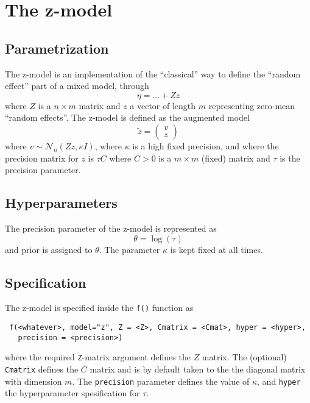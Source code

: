 \documentclass[a4paper,11pt]{article}
\begin{document}
\section*{The z-model}

\subsection*{Parametrization}

The z-model is an implementation of the ``classical'' way to define
the ``random effect'' part of a mixed model, through
\begin{displaymath}
    \eta = \ldots + Z z 
\end{displaymath}
where $Z$ is a $n\times m$ matrix and $z$ a vector of length $m$
representing zero-mean ``random effects''. The z-model is defined as
the augmented model
\begin{displaymath}
    \widetilde{z} =
    \begin{pmatrix}
        v \\
        z 
    \end{pmatrix}
\end{displaymath}
where $v \sim {\mathcal N}_{n}(Zz, \kappa I)$, where $\kappa$ is a high
fixed precision, and where the precision matrix for $z$ is $\tau C$
where $C > 0$ is a $m\times m$ (fixed) matrix and $\tau$ is the
precision parameter. 

\subsection*{Hyperparameters}

The precision parameter of the z-model is represented as
\begin{displaymath}
    \theta = \log(\tau)
\end{displaymath}
and prior is assigned to $\theta$. The parameter $\kappa$ is kept
fixed at all times.

\subsection*{Specification}

The z-model is specified inside the {\tt f()} function as
\begin{verbatim}
 f(<whatever>, model="z", Z = <Z>, Cmatrix = <Cmat>, hyper = <hyper>,
   precision = <precision>)
\end{verbatim}
where the required \texttt{Z}-matrix argument defines the $Z$
matrix. The (optional) \texttt{Cmatrix} defines the $C$ matrix and is
by default taken to the the diagonal matrix with dimension $m$.  The
\texttt{precision} parameter defines the value of $\kappa$, and
\texttt{hyper} the hyperparameter spesification for $\tau$.
\end{document}

